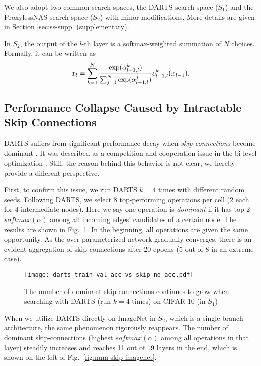 \documentclass[runningheads]{llncs}
\begin{document}
We also adopt two common search spaces, the DARTS \cite{liu2018darts} search space ($S_1$) and the ProxylessNAS \cite{cai2018proxylessnas} search space ($S_2$) with minor modifications. More details are given in Section \ref{sec:ss-supp} (supplementary).

In $S_2$, the output of the $l$-th layer is a softmax-weighted summation of $N$ choices. Formally, it can be written as
\begin{align}{\label{eq:imagenet_sum}}
	x_l = \sum_{k=1}^{N}\frac{\exp(\alpha_{l-1,l}^k)}{\sum_{j=1}^{N}\exp(\alpha_{l-1,l}^j)}o^k_{l-1,l}(x_{l-1}). 
\end{align} 

\subsection{Performance Collapse Caused by Intractable Skip Connections}{\label{sec:skip}}
DARTS suffers from significant performance decay when \emph{skip connections} become dominant \cite{chen2019progressive,liang2019darts}. It was described as a competition-and-cooperation issue in the bi-level optimization \cite{liang2019darts}. Still, the reason behind this behavior is not clear, we hereby provide a different perspective.

First, to confirm this issue, we run DARTS $k=4$ times with different random seeds. Following DARTS, we select 8 top-performing operations per cell (2 each for 4 intermediate nodes).  Here we say one operation is \emph{dominant} if it has top-2 $softmax(\alpha)$ among all incoming edges' candidates of a certain node. The results are shown in Fig.~\ref{fig:num-skip-cifar}. In the beginning, all operations are given the same opportunity. As the over-parameterized network gradually converges, there is an evident aggregation of skip connections after 20 epochs (5 out of 8 in an extreme case).

\begin{figure}[ht]
	\centering
	\texttt{[image: darts-train-val-acc-vs-skip-no-acc.pdf]}
\caption{The number of dominant skip connections continues to grow when searching with DARTS (run $k=4$ times) on CIFAR-10 (in $S_1$)}
	\label{fig:num-skip-cifar}
\end{figure}



When we utilize DARTS directly on ImageNet in $S_2$, which is a single branch architecture, the same phenomenon rigorously reappears. The number of dominant skip-connections (highest $softmax(\alpha)$ among all operations in that layer) steadily increases and reaches 11 out of 19 layers  in the end, which is shown on the left of Fig.~\ref{fig:num-skip-imagenet}. 
\end{document}
